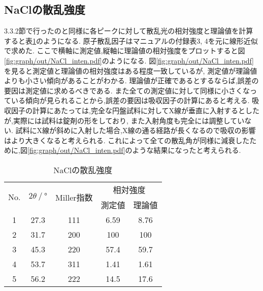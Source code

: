 \subsection{NaClの散乱強度}
3.3.2節で行ったのと同様に各ピークに対して散乱光の相対強度と理論値を計算すると表\ref{tab:nacl_kyoudo}のようになる.
原子散乱因子はマニュアルの付録表3, 4\cite{bussitu}を元に線形近似で求めた.
ここで横軸に測定値,縦軸に理論値の相対強度をプロットすると図\ref{fig:graph/out/NaCl_inten.pdf}のようになる.
図\ref{fig:graph/out/NaCl_inten.pdf}を見ると測定値と理論値の相対強度はある程度一致しているが,
測定値が理論値よりも小さい傾向があることがわかる.
理論値が正確であるとするならば,誤差の要因は測定値に求めるべきである.
また全ての測定値に対して同様に小さくなっている傾向が見られることから,誤差の要因は吸収因子の計算にあると考える.
吸収因子の計算にあたっては,完全な円盤試料に対してX線が垂直に入射するとしたが,実際には試料は錠剤の形をしており,
また入射角度も完全には調整していない.
試料にX線が斜めに入射した場合,X線の通る経路が長くなるので吸収の影響はより大きくなると考えられる.
これによって全ての散乱角が同様に減衰したために,図\ref{fig:graph/out/NaCl_inten.pdf}のような結果になったと考えられる.
\begin{table}[h]
\caption{NaClの散乱強度}
\label{tab:nacl_kyoudo}
\centering
\begin{tabular}{ccccc}
\hline
\multirow{2}{*}{No.}&\multirow{2}{*}{$2\theta\ /\ \si{\degree}$}&\multirow{2}{*}{Miller指数}&\multicolumn{2}{c}{相対強度}\\
&&&測定値&理論値\\
\hline \hline
1&27.3&111&6.59&8.76\\
2&31.7&200&100&100\\
3&45.3&220&57.4&59.7\\
4&53.7&311&1.41&1.61\\
5&56.2&222&14.5&17.6\\
\hline
\end{tabular}
\end{table}
